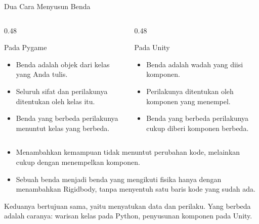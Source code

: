 \documentclass[aspectratio=169,10pt]{beamer}
\begin{document}
\begin{frame}{Dua Cara Menyusun Benda}
\begin{columns}[T,onlytextwidth]
  \begin{column}{0.48\textwidth}
    \begin{block}{Pada Pygame}
      \begin{itemize}
        \item Benda adalah objek dari kelas yang Anda tulis.
        \item Seluruh sifat dan perilakunya ditentukan oleh kelas itu.
        \item Benda yang berbeda perilakunya menuntut kelas yang berbeda.
      \end{itemize}
    \end{block}
  \end{column}
  \begin{column}{0.48\textwidth}
    \begin{exampleblock}{Pada Unity}
      \begin{itemize}
        \item Benda adalah wadah yang diisi komponen.
        \item Perilakunya ditentukan oleh komponen yang menempel.
        \item Benda yang berbeda perilakunya cukup diberi komponen berbeda.
      \end{itemize}
    \end{exampleblock}
  \end{column}
\end{columns}
\vspace{0.18cm}
\begin{itemize}
  \item Menambahkan kemampuan tidak menuntut perubahan kode, melainkan cukup
        dengan menempelkan komponen.
  \item Sebuah benda menjadi benda yang mengikuti fisika hanya dengan
        menambahkan Rigidbody, tanpa menyentuh satu baris kode yang sudah ada.
\end{itemize}
\vspace{0.10cm}
\begin{kotak}
Keduanya bertujuan sama, yaitu menyatukan data dan perilaku. Yang berbeda
adalah caranya: warisan kelas pada Python, penyusunan komponen pada Unity.
\end{kotak}
\end{frame}
\end{document}
